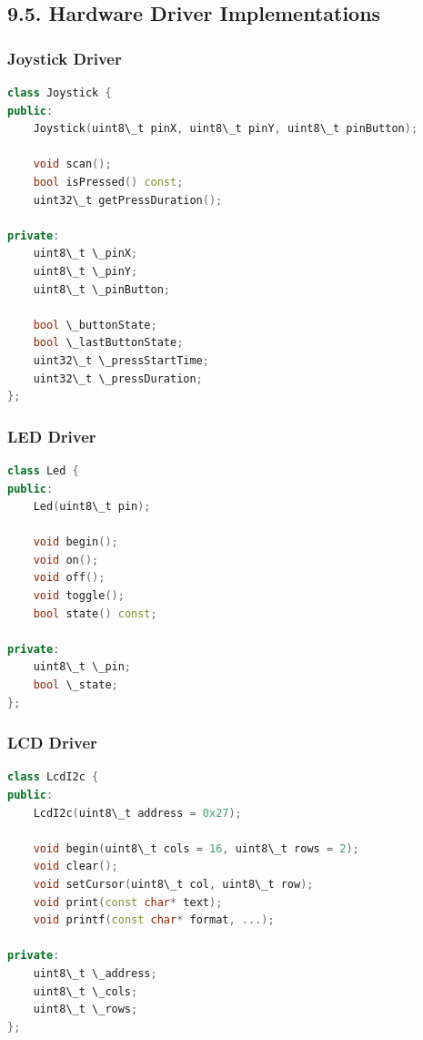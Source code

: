 \documentclass[12pt]{article}
\begin{document}
\subsection*{9.5. Hardware Driver Implementations}

\subsubsection*{Joystick Driver}

\begin{lstlisting}[language=C++, caption=Joystick Driver Interface (joystick.h)]
class Joystick {
public:
    Joystick(uint8\_t pinX, uint8\_t pinY, uint8\_t pinButton);
    
    void scan();
    bool isPressed() const;
    uint32\_t getPressDuration();
    
private:
    uint8\_t \_pinX;
    uint8\_t \_pinY;
    uint8\_t \_pinButton;
    
    bool \_buttonState;
    bool \_lastButtonState;
    uint32\_t \_pressStartTime;
    uint32\_t \_pressDuration;
};
\end{lstlisting}

\subsubsection*{LED Driver}

\begin{lstlisting}[language=C++, caption=LED Driver Interface (led.h)]
class Led {
public:
    Led(uint8\_t pin);
    
    void begin();
    void on();
    void off();
    void toggle();
    bool state() const;
    
private:
    uint8\_t \_pin;
    bool \_state;
};
\end{lstlisting}

\subsubsection*{LCD Driver}

\begin{lstlisting}[language=C++, caption=LCD Driver Interface (lcd.h)]
class LcdI2c {
public:
    LcdI2c(uint8\_t address = 0x27);
    
    void begin(uint8\_t cols = 16, uint8\_t rows = 2);
    void clear();
    void setCursor(uint8\_t col, uint8\_t row);
    void print(const char* text);
    void printf(const char* format, ...);
    
private:
    uint8\_t \_address;
    uint8\_t \_cols;
    uint8\_t \_rows;
};
\end{lstlisting}
\end{document}
